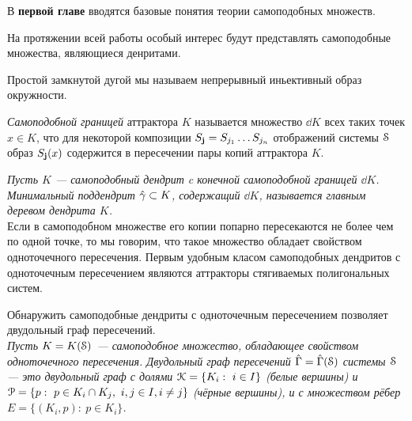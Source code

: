В \textbf{первой главе} вводятся базовые понятия теории самоподобных множеств.



На протяжении всей работы особый интерес будут представлять самоподобные множества, являющиеся денритами. 


Простой замкнутой дугой мы называем непрерывный иньективный образ окружности.

{\em Самоподобной границей} аттрактора $K$ называется множество $\dd K$ всех таких точек $x\in K$, что для некоторой композиции $S_{\bf{j}}=S_{j_1}\ldots S_{j_n}$ отображений системы ${\EuScript S}$ образ $S_{\bf{j}}(x)$ содержится в пересечении пары копий аттрактора $K$.

{\em Пусть $K$ --- самоподобный дендрит c конечной самоподобной границей $\dd K$. 
Минимальный поддендрит $\hat\gamma\subset K$, содержащий $\dd K$, называется {\em главным деревом} дендрита $K$.}\\


Если в самоподобном множестве его копии попарно пересекаются не более чем по одной точке, то мы говорим, что такое множество обладает свойством одноточечного пересечения.
Первым удобным класом самоподобных дендритов с одноточечным пересечением являются аттракторы стягиваемых полигональных систем.



Обнаружить самоподобные дендриты с одноточечным пересечением позволяет двудольный граф пересечений.\\

{\em  Пусть $K=K({\EuScript S})$ --- самоподобное множество, обладающее свойством одноточечного пересечения.
{\em Двудольный граф пересечений} $\hat\Gamma=\hat\Gamma({\EuScript S})$ системы ${\EuScript S}$ --- это двудольный граф с долями ${\EuScript K}=\{K_i:\ i\in I\}$ (белые вершины) и ${\EuScript P}=\{p:\ p\in K_i\cap K_j,\ i,j\in I, i\neq j\}$ (чёрные вершины), и с множеством рёбер $E=\{(K_i,p):\ p\in K_i\}$.}\\

